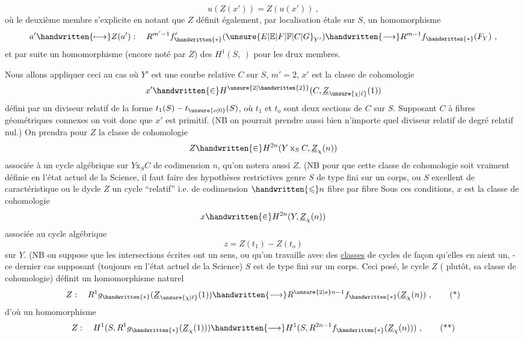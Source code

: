 \[
u(Z(x'))=Z(u(x'))\ ,
\]
où le deuxième membre s'explicite en notant que $Z$ définit également, par
localisation étale sur $S$, un homomorphisme
\[
a'\handwritten{\longmapsto}Z(a'):\quad R^{m'-1}f'_{\handwritten{*}}({\unsure{E|\mathbb{E}|F|\mathbb{F}|C|G}}_{Y'})\handwritten{\longrightarrow}R^{m-1}f_{\handwritten{*}}(F_Y)\ ,
\]
et par suite un homomorphisme (encore noté par $Z$) des $H^1(S,\ )$ pour les drux membres.

Nous allons appliquer ceci au cas où $Y'$ est une courbe relative $C$ sur $S$, $m'=2$, $x'$ est la classe de cohomologie
\[
x'\handwritten{\in}H^{\unsure{2|\handwritten{2}}}(C,\underline{Z}_{\unsure{\chi|\ell}}(1))
\]
défini par un diviseur relatif de la forme $t_1(S)-t_{\unsure{o|0}}(S)$, où $t_1$ et $t_o$ sont deux sections de $C$ sur $S$. Supposant $C$ à fibres géométriques connexes on voit donc que $x'$ est primitif. (NB on pourrait prendre aussi bien n'importe quel diviseur relatif de degré relatif nul.) On prendra pour $Z$ la classe de cohomologie
\[
Z\handwritten{\in}H^{2n}(Y\mathbin{\mathrm{x}}_S C,\underline{Z}_{\chi}(n))
\]
associée à un cycle algébrique sur $Y\mathbin{\mathrm{x}}_S C$ de codimension $n$, qu'on notera aussi $Z$. (NB pour que cette classe de cohomologie soit vraiment définie en l'état actuel de la Science, il faut faire des hypothèses restrictives genre $S$ de type fini sur un corps, ou $S$ excellent de caractéristique  ou le dycle $Z$ un cycle ``relatif'' i.e. de codimension $\handwritten{\leqslant}n$ fibre par fibre
Sous ces conditions, $x$ est la classe de cohomologie
\[
x\handwritten{\in}H^{2n}(Y,\underline{Z}_{\chi}(n))
\]
associée au cycle algébrique
\[
z=Z(t_1)-Z(t_o)
\]
sur $Y$. (NB on suppose que les intersections écrites ont un sens, ou qu'on travaille avec des \uline{classes} de cycles de façon qu'elles en aient un, - ce dernier cas supposant (toujours en l'état actuel de la Science)  $S$ est de type fini sur un corps.
Ceci posé, le cycle $Z$ ( plutôt, sa classe de cohomologie) définit un homomorphisme naturel
\[
Z:\quad R^1g_{\handwritten{*}}(\underline{Z}_{\unsure{\chi|\ell}}(1))\handwritten{\longrightarrow}R^{\unsure{2|a}n-1}f_{\handwritten{*}}(\underline{Z}_{\chi}(n))\ ,\tag*{(*)}
\]
d'où un homomorphisme
\[
Z:\quad H^1(S,R^1g_{\handwritten{*}}(\underline{Z}_{\chi}(1)))\handwritten{\longrightarrow}H^1(S,R^{2n-1}f_{\handwritten{*}}(\underline{Z}_{\chi}(n)))\ ,\tag*{(**)}
\]
